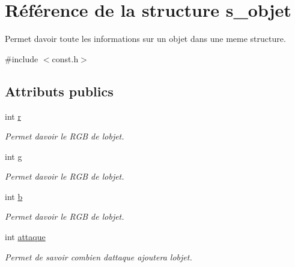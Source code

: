 \hypertarget{structs__objet}{}\section{Référence de la structure s\+\_\+objet}
\label{structs__objet}


Permet d\textquotesingle{}avoir toute les informations sur un objet dans une meme structure.  




{\ttfamily \#include $<$const.\+h$>$}

\subsection*{Attributs publics}
\begin{DoxyCompactItemize}
\item 
\mbox{\label{structs__objet_ab7cf94f0fcc35406014ba2958697b8b0}} 
int \hyperlink{structs__objet_ab7cf94f0fcc35406014ba2958697b8b0}{r}
\begin{DoxyCompactList}\small\item\em Permet d\textquotesingle{}avoir le R\+GB de l\textquotesingle{}objet. \end{DoxyCompactList}\item 
\mbox{\label{structs__objet_ad7839aacf163337fbb4d3f1a6fa1814e}} 
int \hyperlink{structs__objet_ad7839aacf163337fbb4d3f1a6fa1814e}{g}
\begin{DoxyCompactList}\small\item\em Permet d\textquotesingle{}avoir le R\+GB de l\textquotesingle{}objet. \end{DoxyCompactList}\item 
\mbox{\label{structs__objet_a8ab3d3d1e5596ca19d5bfbc0db7add4f}} 
int \hyperlink{structs__objet_a8ab3d3d1e5596ca19d5bfbc0db7add4f}{b}
\begin{DoxyCompactList}\small\item\em Permet d\textquotesingle{}avoir le R\+GB de l\textquotesingle{}objet. \end{DoxyCompactList}\item 
\mbox{\label{structs__objet_a98de2bef351d14f5e88e849d08d9994c}} 
int \hyperlink{structs__objet_a98de2bef351d14f5e88e849d08d9994c}{attaque}
\begin{DoxyCompactList}\small\item\em Permet de savoir combien d\textquotesingle{}attaque ajoutera l\textquotesingle{}objet. \end{DoxyCompactList}\item 

\end{DoxyCompactItemize}
